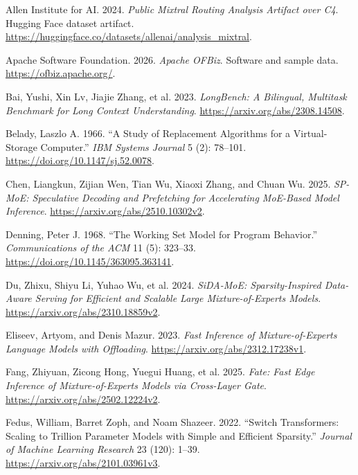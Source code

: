 \documentclass[
  10pt,
  letterpaper,
  10pt]{article}
\newlength{\cslhangindent}
\newenvironment{CSLReferences}[2] %
 {\begin{list}{}{%
  \setlength{\itemindent}{0pt}
  \setlength{\leftmargin}{0pt}
  \setlength{\parsep}{0pt}
  \ifodd #1
   \setlength{\leftmargin}{\cslhangindent}
   \setlength{\itemindent}{-1\cslhangindent}
  \fi
  \setlength{\itemsep}{#2\baselineskip}}}
 {\end{list}}
\begin{document}
\protect{}\label{refs}
\begin{CSLReferences}{1}{1}
Allen Institute for AI. 2024. \emph{Public {Mixtral} Routing Analysis
Artifact over {C4}}. Hugging Face dataset artifact.
\url{https://huggingface.co/datasets/allenai/analysis_mixtral}.

Apache Software Foundation. 2026. \emph{Apache {OFBiz}}. Software and
sample data. \url{https://ofbiz.apache.org/}.

Bai, Yushi, Xin Lv, Jiajie Zhang, et al. 2023. \emph{{LongBench}: A
Bilingual, Multitask Benchmark for Long Context Understanding}.
\url{https://arxiv.org/abs/2308.14508}.

Belady, Laszlo A. 1966. {``A Study of Replacement Algorithms for a
Virtual-Storage Computer.''} \emph{IBM Systems Journal} 5 (2): 78--101.
\url{https://doi.org/10.1147/sj.52.0078}.

Chen, Liangkun, Zijian Wen, Tian Wu, Xiaoxi Zhang, and Chuan Wu. 2025.
\emph{{SP-MoE}: Speculative Decoding and Prefetching for Accelerating
{MoE}-Based Model Inference}. \url{https://arxiv.org/abs/2510.10302v2}.

Denning, Peter J. 1968. {``The Working Set Model for Program
Behavior.''} \emph{Communications of the ACM} 11 (5): 323--33.
\url{https://doi.org/10.1145/363095.363141}.

Du, Zhixu, Shiyu Li, Yuhao Wu, et al. 2024. \emph{{SiDA-MoE}:
Sparsity-Inspired Data-Aware Serving for Efficient and Scalable Large
Mixture-of-Experts Models}. \url{https://arxiv.org/abs/2310.18859v2}.

Eliseev, Artyom, and Denis Mazur. 2023. \emph{Fast Inference of
Mixture-of-Experts Language Models with Offloading}.
\url{https://arxiv.org/abs/2312.17238v1}.

Fang, Zhiyuan, Zicong Hong, Yuegui Huang, et al. 2025. \emph{{Fate}:
Fast Edge Inference of Mixture-of-Experts Models via Cross-Layer Gate}.
\url{https://arxiv.org/abs/2502.12224v2}.

Fedus, William, Barret Zoph, and Noam Shazeer. 2022. {``Switch
Transformers: Scaling to Trillion Parameter Models with Simple and
Efficient Sparsity.''} \emph{Journal of Machine Learning Research} 23
(120): 1--39. \url{https://arxiv.org/abs/2101.03961v3}.


\end{CSLReferences}
\end{document}
